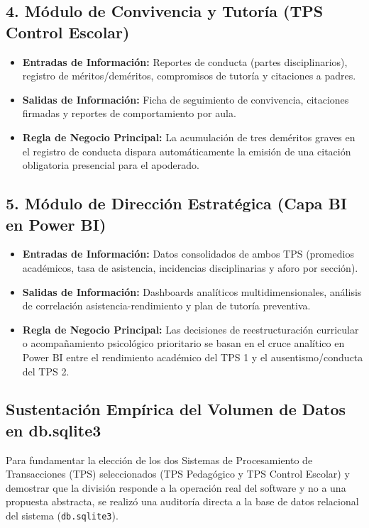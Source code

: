 \documentclass[12pt,a4paper,oneside]{report}
\begin{document}
    \subsection{4. Módulo de Convivencia y Tutoría (TPS Control Escolar)}
    \begin{itemize}
        \item \textbf{Entradas de Información:} Reportes de conducta (partes disciplinarios), registro de méritos/deméritos, compromisos de tutoría y citaciones a padres.
        \item \textbf{Salidas de Información:} Ficha de seguimiento de convivencia, citaciones firmadas y reportes de comportamiento por aula.
        \item \textbf{Regla de Negocio Principal:} La acumulación de tres deméritos graves en el registro de conducta dispara automáticamente la emisión de una citación obligatoria presencial para el apoderado.
    \end{itemize}

    \subsection{5. Módulo de Dirección Estratégica (Capa BI en Power BI)}
    \begin{itemize}
        \item \textbf{Entradas de Información:} Datos consolidados de ambos TPS (promedios académicos, tasa de asistencia, incidencias disciplinarias y aforo por sección).
        \item \textbf{Salidas de Información:} Dashboards analíticos multidimensionales, análisis de correlación asistencia-rendimiento y plan de tutoría preventiva.
        \item \textbf{Regla de Negocio Principal:} Las decisiones de reestructuración curricular o acompañamiento psicológico prioritario se basan en el cruce analítico en Power BI entre el rendimiento académico del TPS 1 y el ausentismo/conducta del TPS 2.
    \end{itemize}

    \subsection{Sustentación Empírica del Volumen de Datos en db.sqlite3}

Para fundamentar la elección de los dos Sistemas de Procesamiento de Transacciones (TPS) seleccionados (TPS Pedagógico y TPS Control Escolar) y demostrar que la división responde a la operación real del software y no a una propuesta abstracta, se realizó una auditoría directa a la base de datos relacional del sistema (\texttt{db.sqlite3}).
\end{document}
